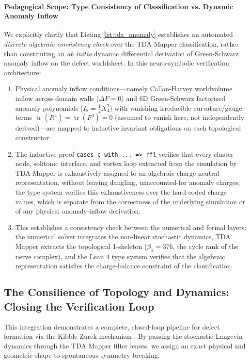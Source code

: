 \documentclass[11pt,a4paper]{article}
\newcommand{\numreconcile}[2]{#1}
\begin{document}
\paragraph{Pedagogical Scope: Type Consistency of Classification vs. Dynamic Anomaly Inflow}
We explicitly clarify that Listing \ref{lst:tda_anomaly} establishes an automated \emph{discrete algebraic consistency check} over the TDA Mapper classification, rather than constituting an \emph{ab initio} dynamic differential derivation of Green-Schwarz anomaly inflow on the defect worldsheet. In this neuro-symbolic verification architecture:
\begin{enumerate}
    \item Physical anomaly inflow conditions—namely Callan-Harvey worldvolume inflow across domain walls ($\Delta F = 0$) and 6D Green-Schwarz factorized anomaly polynomials ($I_8 = \frac{1}{2} X_4^2$) with vanishing irreducible curvature/gauge terms $\operatorname{tr}(R^4) = \operatorname{tr}(F^4) = 0$ (assumed to vanish here, not independently derived)—are mapped to inductive invariant obligations on each topological constructor.
    \item The inductive proof \texttt{cases c with ... => rfl} verifies that every cluster node, solitonic interface, and vortex loop extracted from the simulation by TDA Mapper is exhaustively assigned to an algebraic charge-neutral representation, without leaving dangling, unaccounted-for anomaly charges; the type system verifies this exhaustiveness over the hard-coded charge values, which is separate from the correctness of the underlying simulation or of any physical anomaly-inflow derivation.
    \item This establishes a consistency check between the numerical and formal layers: the numerical solver integrates the non-linear stochastic dynamics, TDA Mapper extracts the topological 1-skeleton ($\beta_1 = \numreconcile{376}{cycle rank}$, the cycle rank of the nerve complex), and the Lean 4 type system verifies that the algebraic representation satisfies the charge-balance constraint of the classification.
\end{enumerate}

\subsection{The Consilience of Topology and Dynamics: Closing the Verification Loop}
\label{sec:tda_closed_loop}
This integration demonstrates a complete, closed-loop pipeline for defect formation via the Kibble-Zurek mechanism \cite{kibble1976, zurek1985}. By passing the stochastic Langevin dynamics through the TDA Mapper filter lenses, we assign an exact physical and geometric shape to spontaneous symmetry breaking.
\end{document}
